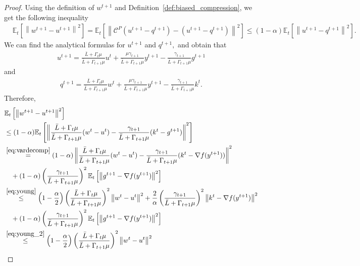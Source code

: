 \documentclass{article} %
\newcommand{\norm}[1]{\left\| #1 \right\|}
\newcommand{\ExpSub}[2]{{\mathbb{E}}_{#1}\left[#2\right]}
\newcommand{\cC}{\mathcal{C}}
\theoremstyle{plain}
\theoremstyle{definition}
\theoremstyle{remark}
\begin{document}
\begin{proof}
  Using the definition of $w^{t+1}$ and Definition~\ref{def:biased_compression}, we get the following inequality
\begin{align*}
  &\ExpSub{t}{\norm{w^{t+1} - u^{t+1}}^2} =\ExpSub{t}{\norm{\cC^{P}\left(u^{t+1} - q^{t+1}\right) - (u^{t+1} - q^{t+1})}^2} \leq (1 - \alpha)\ExpSub{t}{\norm{u^{t+1} - q^{t+1}}^2}.
\end{align*}
We can find the analytical formulas for $u^{t+1}$ and $q^{t+1},$ and obtain that
\begin{align*}
  u^{t+1} = \frac{\bar{L} + \Gamma_{t} \mu}{\bar{L} + \Gamma_{t+1} \mu} u^t + \frac{\mu \gamma_{t+1}}{\bar{L} + \Gamma_{t+1} \mu} y^{t+1} - \frac{\gamma_{t+1}}{\bar{L} + \Gamma_{t+1} \mu} g^{t+1}
\end{align*}
and 
\begin{align*}
  q^{t+1} = \frac{\bar{L} + \Gamma_{t} \mu}{\bar{L} + \Gamma_{t+1} \mu} w^t + \frac{\mu \gamma_{t+1}}{\bar{L} + \Gamma_{t+1} \mu} y^{t+1} - \frac{\gamma_{t+1}}{\bar{L} + \Gamma_{t+1} \mu} k^t.
\end{align*}
Therefore,
\begin{align*}
  &\ExpSub{t}{\norm{w^{t+1} - u^{t+1}}^2} \\
  &\leq (1 - \alpha)\ExpSub{t}{\norm{\frac{\bar{L} + \Gamma_{t} \mu}{\bar{L} + \Gamma_{t+1} \mu} (w^t - u^t) - \frac{\gamma_{t+1}}{\bar{L} + \Gamma_{t+1} \mu} (k^t - g^{t+1})}^2} \\
  &\overset{\eqref{eq:vardecomp}}{=} (1 - \alpha)\norm{\frac{\bar{L} + \Gamma_{t} \mu}{\bar{L} + \Gamma_{t+1} \mu} (w^t - u^t) - \frac{\gamma_{t+1}}{\bar{L} + \Gamma_{t+1} \mu} (k^t - \nabla f(y^{t+1}))}^2 \\
  &\quad + (1 - \alpha)\left(\frac{\gamma_{t+1}}{\bar{L} + \Gamma_{t+1} \mu}\right)^2\ExpSub{t}{\norm{g^{t+1} - \nabla f(y^{t+1})}^2} \\
  &\overset{\eqref{eq:young}}{\leq} \left(1 - \frac{\alpha}{2}\right) \left(\frac{\bar{L} + \Gamma_{t} \mu}{\bar{L} + \Gamma_{t+1} \mu}\right)^2\norm{w^t - u^t}^2 + \frac{2}{\alpha} \left(\frac{\gamma_{t+1}}{\bar{L} + \Gamma_{t+1} \mu}\right)^2 \norm{k^t - \nabla f(y^{t+1})}^2 \\
  &\quad + (1 - \alpha)\left(\frac{\gamma_{t+1}}{\bar{L} + \Gamma_{t+1} \mu}\right)^2\ExpSub{t}{\norm{g^{t+1} - \nabla f(y^{t+1})}^2} \\
  &\overset{\eqref{eq:young_2}}{\leq} \left(1 - \frac{\alpha}{2}\right) \left(\frac{\bar{L} + \Gamma_{t} \mu}{\bar{L} + \Gamma_{t+1} \mu}\right)^2\norm{w^t - u^t}^2 \\

\end{align*}
\end{proof}
\end{document}
